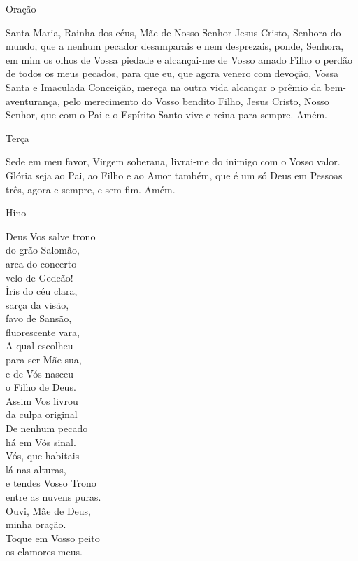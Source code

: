 \documentclass{book}
\begin{document}
\begin{center}
    \textcolor{VioletRed2}{Oração}
\end{center}
\begin{flushleft}
    Santa Maria, Rainha dos céus, Mãe de Nosso Senhor Jesus Cristo, Senhora do mundo, que a nenhum pecador desamparais e nem desprezais, ponde, Senhora, em mim os olhos de Vossa piedade e alcançai-me de Vosso amado Filho o perdão de todos os meus pecados, para que eu, que agora venero com devoção, Vossa Santa e Imaculada Conceição, mereça na outra vida alcançar o prêmio da bem-aventurança, pelo merecimento do Vosso bendito Filho, Jesus Cristo, Nosso Senhor, que com o Pai e o Espírito Santo vive e reina para sempre. Amém.
\end{flushleft}
\begin{center}
    Terça
\end{center}
\begin{flushleft}
    Sede em meu favor, Virgem soberana, livrai-me do inimigo com o Vosso valor. Glória seja ao Pai, ao Filho e ao Amor também, que é um só Deus em Pessoas três, agora e sempre, e sem fim. Amém.
\end{flushleft}
\begin{center}
    \textcolor{VioletRed2}{Hino}
\end{center}
\begin{multicols}{2}
    Deus Vos salve trono \\
    do grão Salomão, \\
    arca do concerto \\
    velo de Gedeão!
    \vspace{.2cm} \\
    Íris do céu clara, \\
    sarça da visão, \\
    favo de Sansão, \\
    fluorescente vara,
    \vspace{.2cm} \\
    A qual escolheu \\
    para ser Mãe sua, \\
    e de Vós nasceu \\
    o Filho de Deus.
    \vspace{.2cm} \\
    Assim Vos livrou \\
    da culpa original \\
    De nenhum pecado \\
    há em Vós sinal.
    \vspace{.2cm} \\
    Vós, que habitais \\
    lá nas alturas, \\
    e tendes Vosso Trono \\
    entre as nuvens puras.
    \vspace{.2cm} \\
    Ouvi, Mãe de Deus, \\
    minha oração. \\
    Toque em Vosso peito \\
    os clamores meus.
\end{multicols}
\end{document}
